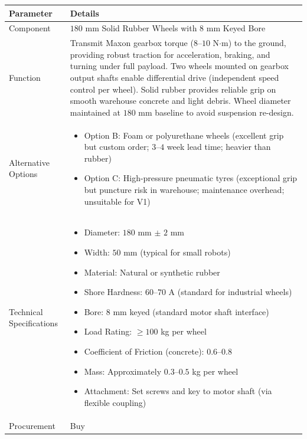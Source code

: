 \documentclass[12pt,a4paper]{article}
\begin{document}
\begin{longtable}{|p{4cm}|p{10cm}|}
\hline
\textbf{Parameter} & \textbf{Details} \\
\hline

Component &
$180$ mm Solid Rubber Wheels with $8$ mm Keyed Bore \\
\hline

Function &
Transmit Maxon gearbox torque ($8$--$10$ N$\cdot$m) to the ground, providing robust traction for acceleration, braking, and turning under full payload. Two wheels mounted on gearbox output shafts enable differential drive (independent speed control per wheel). Solid rubber provides reliable grip on smooth warehouse concrete and light debris. Wheel diameter maintained at $180$ mm baseline to avoid suspension re-design. \\
\hline

Alternative Options &
\begin{itemize}
\item Option B: Foam or polyurethane wheels (excellent grip but custom order; $3$--$4$ week lead time; heavier than rubber)
\item Option C: High-pressure pneumatic tyres (exceptional grip but puncture risk in warehouse; maintenance overhead; unsuitable for V1)
\end{itemize}
\\
\hline

Technical Specifications &
\begin{itemize}
\item Diameter: $180$ mm $\pm$ $2$ mm
\item Width: $50$ mm (typical for small robots)
\item Material: Natural or synthetic rubber
\item Shore Hardness: $60$--$70$ A (standard for industrial wheels)
\item Bore: $8$ mm keyed (standard motor shaft interface)
\item Load Rating: $\geq 100$ kg per wheel
\item Coefficient of Friction (concrete): $0.6$--$0.8$
\item Mass: Approximately $0.3$--$0.5$ kg per wheel
\item Attachment: Set screws and key to motor shaft (via flexible coupling)
\end{itemize}
\\
\hline

Procurement &
Buy \\
\hline


\end{longtable}
\end{document}
